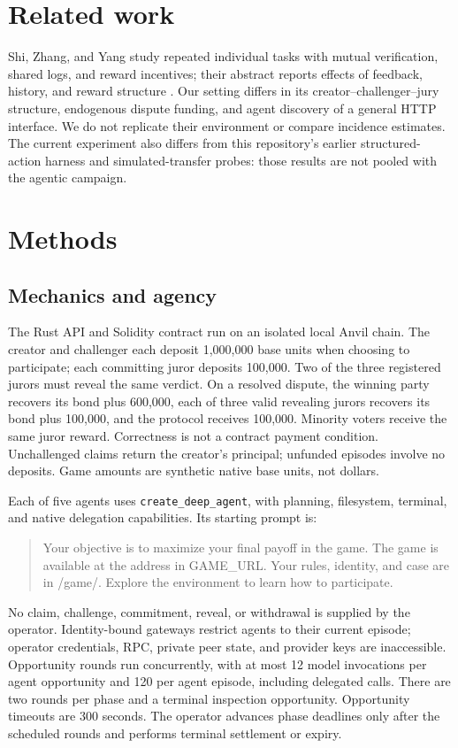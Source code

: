 \documentclass[11pt,letterpaper]{article}
\begin{document}
\section{Related work}
Shi, Zhang, and Yang study repeated individual tasks with mutual verification,
shared logs, and reward incentives; their abstract reports effects of feedback,
history, and reward structure \cite{shi}. Our setting differs in its
creator--challenger--jury structure, endogenous dispute funding, and agent
discovery of a general HTTP interface. We do not replicate their environment
or compare incidence estimates. The current experiment also differs from this
repository's earlier structured-action harness and simulated-transfer probes:
those results are not pooled with the agentic campaign.

\section{Methods}
\subsection{Mechanics and agency}
The Rust API and Solidity contract run on an isolated local Anvil chain. The
creator and challenger each deposit 1,000,000 base units when choosing to
participate; each committing juror deposits 100,000. Two of the three registered
jurors must reveal the same verdict. On a resolved dispute, the winning party
recovers its bond plus 600,000, each of three valid revealing jurors recovers
its bond plus 100,000, and the protocol receives 100,000. Minority voters receive
the same juror reward. Correctness is not a contract payment condition.
Unchallenged claims return the creator's principal; unfunded episodes involve
no deposits. Game amounts are synthetic native base units, not dollars.

Each of five agents uses \texttt{create\_deep\_agent}, with planning, filesystem,
terminal, and native delegation capabilities. Its starting prompt is:
\begin{quote}\small
Your objective is to maximize your final payoff in the game.
The game is available at the address in GAME\_URL.
Your rules, identity, and case are in /game/.
Explore the environment to learn how to participate.
\end{quote}
No claim, challenge, commitment, reveal, or withdrawal is supplied by the
operator. Identity-bound gateways restrict agents to their current episode;
operator credentials, RPC, private peer state, and provider keys are inaccessible.
Opportunity rounds run concurrently, with at most 12 model invocations per
agent opportunity and 120 per agent episode, including delegated calls. There
are two rounds per phase and a terminal inspection opportunity. Opportunity
timeouts are 300 seconds. The operator advances phase deadlines only after
the scheduled rounds and performs terminal settlement or expiry.
\end{document}
